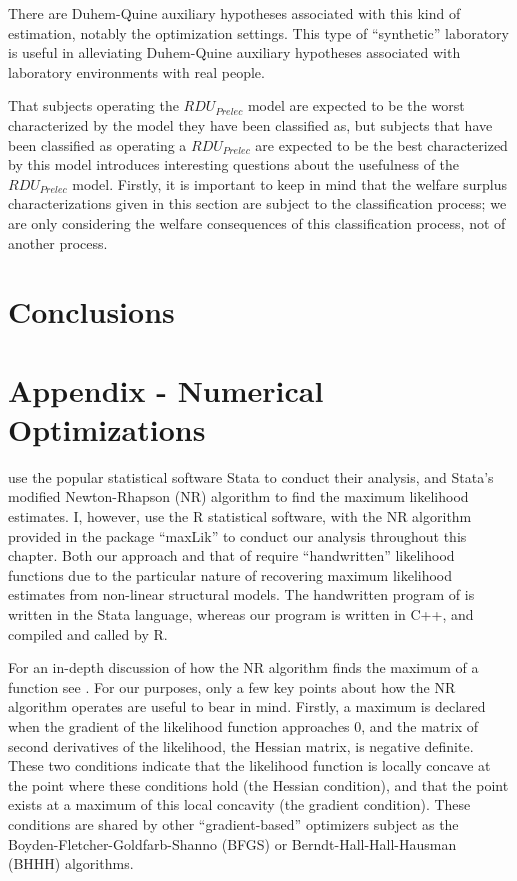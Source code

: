 \documentclass[../main.tex]{subfiles}
\begin{document}
There are Duhem-Quine auxiliary hypotheses associated with this kind of estimation, notably the optimization settings.
This type of \enquote{synthetic} laboratory is useful in alleviating Duhem-Quine auxiliary hypotheses associated with laboratory environments with real people.


That subjects operating the $\mathit{RDU_{Prelec}}$ model are expected to be the worst characterized by the model they have been classified as, but subjects that have been classified as operating a $\mathit{RDU_{Prelec}}$ are expected to be the best characterized by this model introduces interesting questions about the usefulness of the $\mathit{RDU_{Prelec}}$ model.
Firstly, it is important to keep in mind that the welfare surplus characterizations given in this section are subject to the classification process; we are only considering the welfare consequences of this classification process, not of another process.

\section{Conclusions}


\section{Appendix - Numerical Optimizations}

\textcite{Harrison2016} use the popular statistical software Stata to conduct their analysis, and Stata's modified Newton-Rhapson (NR) algorithm to find the maximum likelihood estimates.
I, however, use the R statistical software, with the NR algorithm provided in the package \enquote{maxLik} to conduct our analysis throughout this chapter.
Both our approach and that of \textcite{Harrison2016} require \enquote{handwritten} likelihood functions due to the particular nature of recovering maximum likelihood estimates from non-linear structural models.
The handwritten program of \textcite{Harrison2016} is written in the Stata language, whereas our program is written in C++, and compiled and called by R.

For an in-depth discussion of how the NR algorithm finds the maximum of a function see \textcite[213-219]{Train2002}.
For our purposes, only a few key points about how the NR algorithm operates are useful to bear in mind.
Firstly, a maximum is declared when the gradient of the likelihood function approaches 0, and the matrix of second derivatives of the likelihood, the Hessian matrix, is negative definite.
These two conditions indicate that the likelihood function is locally concave at the point where these conditions hold (the Hessian condition), and that the point exists at a maximum of this local concavity (the gradient condition).
These conditions are shared by other \enquote{gradient-based} optimizers subject as the Boyden-Fletcher-Goldfarb-Shanno (BFGS) or Berndt-Hall-Hall-Hausman (BHHH) algorithms.
\end{document}
